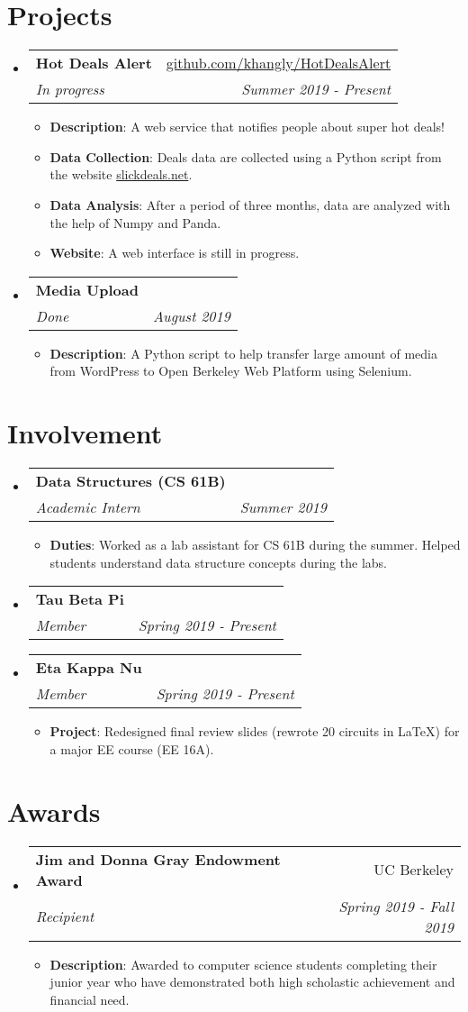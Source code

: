 \documentclass[letterpaper,11pt]{article}
\makeatletter
\newcommand{\resumeItem}[2]{
  \item\small{
    \textbf{#1}{: #2 \vspace{-2pt}}
  }
}
\newcommand{\resumeSubheading}[4]{
  \vspace{-1pt}\item
    \begin{tabular*}{0.97\textwidth}[t]{l@{\extracolsep{\fill}}r}
      \textbf{#1} & #2 \\
      \textit{\small#3} & \textit{\small #4} \\
    \end{tabular*}\vspace{-5pt}
}
\newcommand{\resumeSubHeadingListStart}{\begin{itemize}[leftmargin=*]}
\newcommand{\resumeSubHeadingListEnd}{\end{itemize}}
\newcommand{\resumeItemListStart}{\begin{itemize}}
\newcommand{\resumeItemListEnd}{\end{itemize}\vspace{-5pt}}
\makeatother
\begin{document}
\section{Projects}
  \resumeSubHeadingListStart
    \resumeSubheading
    	{Hot Deals Alert}{\href{https://github.com/khangly/HotDealsAlert}{github.com/khangly/HotDealsAlert}}
    	{In progress}{Summer 2019 - Present}
      \resumeItemListStart
        \resumeItem{Description}
          {A web service that notifies people about super hot deals!}
        \resumeItem{Data Collection}
          {Deals data are collected using a Python script from the website \href{https://slickdeals.net}{slickdeals.net}.}
        \resumeItem{Data Analysis}
          {After a period of three months, data are analyzed with the help of Numpy and Panda.}
        \resumeItem{Website}
          {A web interface is still in progress.}
      \resumeItemListEnd
    \resumeSubheading
    	{Media Upload}{}
    	{Done}{August 2019}
      \resumeItemListStart
        \resumeItem{Description}
          {A Python script to help transfer large amount of media from WordPress to Open Berkeley Web Platform using Selenium.}
      \resumeItemListEnd
  \resumeSubHeadingListEnd


\section{Involvement}
  \resumeSubHeadingListStart
    \resumeSubheading
      {Data Structures (CS 61B)}{}
      {Academic Intern}{Summer 2019}
      \resumeItemListStart
        \resumeItem{Duties}
          {Worked as a lab assistant for CS 61B during the summer. Helped students understand data structure concepts during the labs.}
      \resumeItemListEnd
    \resumeSubheading
      {Tau Beta Pi}{}
      {Member}{Spring 2019 - Present}
    \resumeSubheading
      {Eta Kappa Nu}{}
      {Member}{Spring 2019 - Present}
      \resumeItemListStart
        \resumeItem{Project}
          {Redesigned final review slides (rewrote 20 circuits in LaTeX) for a major EE course (EE 16A).}
      \resumeItemListEnd
  \resumeSubHeadingListEnd


\section{Awards}
  \resumeSubHeadingListStart
    \resumeSubheading
      {Jim and Donna Gray Endowment Award}{UC Berkeley}
      {Recipient}{Spring 2019 - Fall 2019}
      \resumeItemListStart
        \resumeItem{Description}
          {Awarded to computer science students completing their junior year who have demonstrated both high scholastic achievement and financial need.}
      \resumeItemListEnd
  \resumeSubHeadingListEnd
\end{document}
